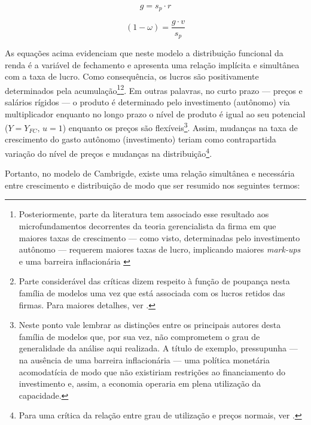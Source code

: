 \begin{equation}
\label{EqCambridge}
g = s_p\cdot r
\end{equation}

\begin{equation}
\label{Cambridge}
(1-\omega) = \frac{g\cdot v}{s_p}
\end{equation}


As equações acima evidenciam que neste modelo a distribuição funcional da renda é a variável de fechamento  e apresenta uma relação implícita e simultânea com a taxa de lucro. Como consequência, os lucros são positivamente determinados pela acumulação\footnote{
	Posteriormente, parte da literatura tem associado esse resultado aos microfundamentos decorrentes da teoria gerencialista da firma em que maiores taxas de crescimento --- como visto, determinadas pelo investimento autônomo --- requerem maiores taxas de lucro, implicando maiores \textit{mark-ups} e uma barreira inflacionária \cite[p.~353]{lavoie_post-keynesian_2015}
}\footnote{Parte considerável das críticas dizem respeito à função de poupança nesta família de modelos uma vez que está associada com os lucros retidos das firmas. Para maiores detalhes, ver  \textcites[Seção III]{skott_kaldoriansaving_1981}{marglin_foundation_1984}{skott_kaldors_1989}.}. 
Em outras palavras, no curto prazo --- preços e salários rígidos --- o produto é determinado pelo investimento (autônomo) via multiplicador enquanto no longo prazo o nível de produto é igual ao seu potencial ($Y = Y_{FC}, \,u=1$) enquanto os preços são flexíveis\footnote{
	Neste ponto vale lembrar as distinções entre os principais autores desta família de modelos que, por sua vez, não comprometem o grau de generalidade da análise aqui realizada. 
	A título de exemplo, \textcite{robinson_model_1962} pressupunha --- na ausência de uma barreira inflacionária --- uma política monetária acomodatícia de modo que não existiriam restrições ao financiamento do investimento e, assim, a economia operaria em plena utilização da capacidade.
}. Assim, mudanças na taxa de crescimento do gasto autônomo (investimento) teriam como contrapartida variação do nível de preços e mudanças na distribuição\footnote{Para uma crítica da relação entre grau de utilização e preços normais, ver \textcite{ciccone_2017}.}. 

Portanto, no modelo de Cambrigde, existe uma relação simultânea e necessária entre crescimento e distribuição de modo que ser resumido nos seguintes termos:

